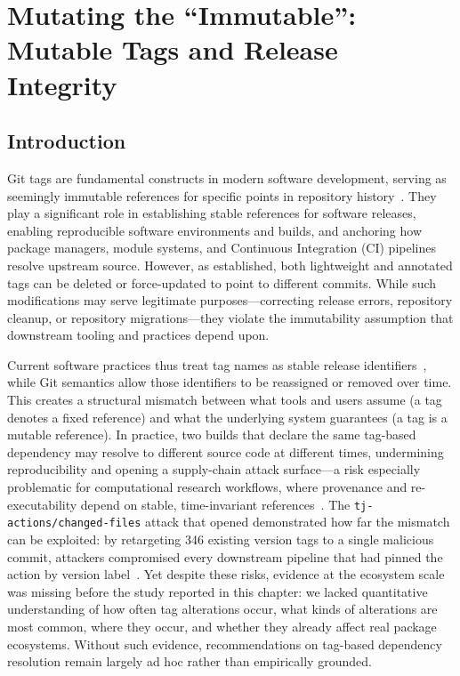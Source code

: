 %
%
\chapter{Mutating the ``Immutable'': Mutable Tags and Release Integrity}
\label{chap:tags}

\section{Introduction}
\label{sec:tags-intro}
 
Git tags are fundamental constructs in modern software development, serving as seemingly immutable references for specific points in repository history~\cite[§2.6, Tagging]{ProGit2014}.
They play a significant role in establishing stable references for software releases, enabling reproducible software environments and builds, and anchoring how package managers, module systems, and Continuous Integration (CI) pipelines resolve upstream source.
However, as  established, both lightweight and annotated tags can be deleted or force-updated to point to different commits.
While such modifications may serve legitimate purposes---correcting release errors, repository cleanup, or repository migrations---they violate the immutability assumption that downstream tooling and practices depend upon.

Current software practices thus treat tag names as stable release identifiers~\cite{commonflow2010}, while Git semantics allow those identifiers to be reassigned or removed over time.
This creates a structural mismatch between what tools and users assume (a tag denotes a fixed reference) and what the underlying system guarantees (a tag is a mutable reference).
In practice, two builds that declare the same tag-based dependency may resolve to different source code at different times, undermining reproducibility and opening a supply-chain attack surface---a risk especially problematic for computational research workflows, where provenance and re-executability depend on stable, time-invariant references~\cite{DBLP:journals/corr/abs-2011-10098,881708}.
The \texttt{tj-actions/changed-files} attack that opened  demonstrated how far the mismatch can be exploited: by retargeting \num{346} existing version tags to a single malicious commit, attackers compromised every downstream pipeline that had pinned the action by version label~\cite{paloalto_unit42_2025}.
Yet despite these risks, evidence at the ecosystem scale was missing before the study reported in this chapter: we lacked quantitative understanding of how often tag alterations occur, what kinds of alterations are most common, where they occur, and whether they already affect real package ecosystems.
Without such evidence, recommendations on tag-based dependency resolution remain largely ad hoc rather than empirically grounded.

